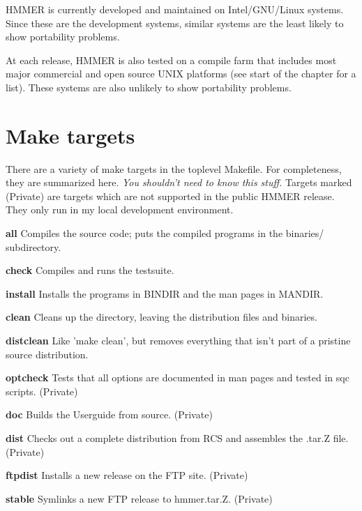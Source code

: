 HMMER is currently developed and maintained on Intel/GNU/Linux
systems. Since these are the development systems, similar systems are
the least likely to show portability problems.

At each release, HMMER is also tested on a compile farm that includes
most major commercial and open source UNIX platforms (see start of the
chapter for a list).  These systems are also unlikely to show
portability problems.

\section{Make targets}

There are a variety of make targets in the toplevel Makefile.  For
completeness, they are summarized here. \textit{You shouldn't need to
know this stuff.} Targets marked (Private) are targets which are not
supported in the public HMMER release. They only run in my local
development environment.

\begin{wideitem}
\item[\textbf{all}]  Compiles the source code; puts the compiled
programs in the binaries/ subdirectory.
 
\item[\textbf{check}]  Compiles and runs the testsuite.

\item[\textbf{install}] Installs the programs in BINDIR and
the man pages in MANDIR.

\item[\textbf{clean}] Cleans up the directory, leaving the
distribution files and binaries.

\item[\textbf{distclean}] Like 'make clean', but removes everything
that isn't part of a pristine source distribution.

\item[\textbf{optcheck}] Tests that all options are documented in man
pages and tested in sqc scripts.
(Private)

\item[\textbf{doc}] Builds the Userguide from \latex source. (Private)

\item[\textbf{dist}] Checks out a complete distribution from RCS
and assembles the .tar.Z file. (Private)

\item[\textbf{ftpdist}] Installs a new release on the FTP
site. (Private)

\item[\textbf{stable}] Symlinks a new FTP release to hmmer.tar.Z. (Private)

\end{wideitem}







